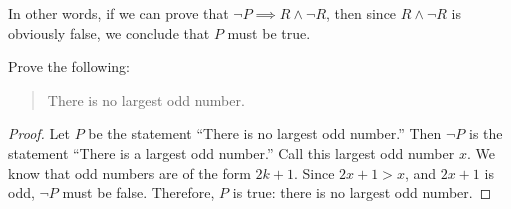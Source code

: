 In other words, if we can prove that $\neg P \implies R \wedge \neg R$, then
since $R \wedge \neg R$ is obviously false, we conclude that $P$ must be true.
%
%
%
\begin{ex}
  Prove the following:
  \begin{quote}
    There is no largest odd number.
  \end{quote}
\begin{proof}
Let $P$ be the statement ``There is no largest odd number.''
Then $\neg P$ is the statement ``There is a largest odd number.''
Call this largest odd number $x$.
We know that odd numbers are of the form $2k+1$.
Since $2x+1 > x$, and $2x+1$ is odd, $\neg P$ must be false.
Therefore, $P$ is true: there is no largest odd number.
\end{proof}
\end{ex}
%
